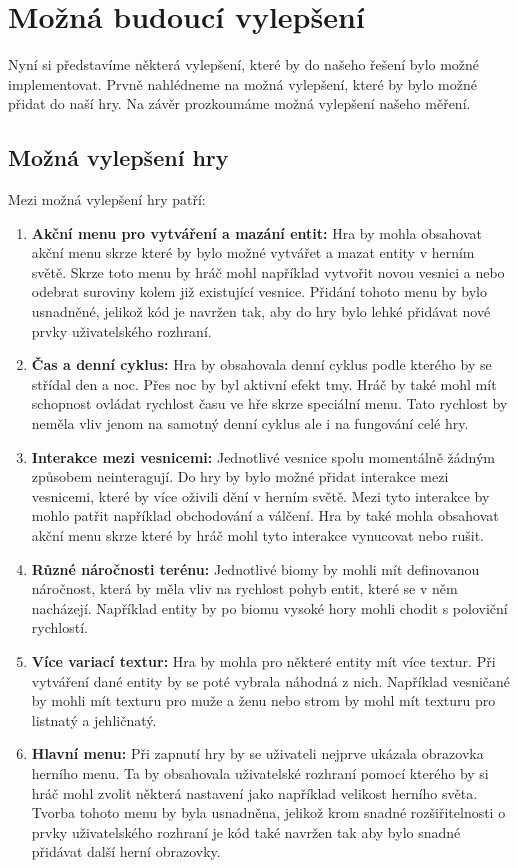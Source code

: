 \section{Možná budoucí vylepšení}
Nyní si představíme některá vylepšení, které by do našeho řešení bylo možné implementovat. Prvně nahlédneme na možná vylepšení, které by bylo možné přidat do naší hry. Na závěr prozkoumáme možná vylepšení našeho měření.

\subsection{Možná vylepšení hry}
Mezi možná vylepšení hry patří:

\begin{enumerate}
    \item \textbf{Akční menu pro vytváření a mazání entit:} Hra by mohla obsahovat akční menu skrze které by bylo možné vytvářet a mazat entity v herním světě. Skrze toto menu by hráč mohl například vytvořit novou vesnici a nebo odebrat suroviny kolem již existující vesnice. Přidání tohoto menu by bylo usnadněné, jelikož kód je navržen tak, aby do hry bylo lehké přidávat nové prvky uživatelského rozhraní. 

    \item \textbf{Čas a denní cyklus:} Hra by obsahovala denní cyklus podle kterého by se střídal den a noc. Přes noc by byl aktivní efekt tmy. Hráč by také mohl mít schopnost ovládat rychlost času ve hře skrze speciální menu. Tato rychlost by neměla vliv jenom na samotný denní cyklus ale i na fungování celé hry.

    \item \textbf{Interakce mezi vesnicemi:} Jednotlivé vesnice spolu momentálně žádným způsobem neinteragují. Do hry by bylo možné přidat interakce mezi vesnicemi, které by více oživili dění v herním světě. Mezi tyto interakce by mohlo patřit například obchodování a válčení. Hra by také mohla obsahovat akční menu skrze které by hráč mohl tyto interakce vynucovat nebo rušit.

    \item \textbf{Různé náročnosti terénu:} Jednotlivé biomy by mohli mít definovanou náročnost, která by měla vliv na rychlost pohyb entit, které se v něm nacházejí. Například entity by po biomu vysoké hory mohli chodit s poloviční rychlostí.

    \item \textbf{Více variací textur:} Hra by mohla pro některé entity mít více textur. Při vytváření dané entity by se poté vybrala náhodná z nich. Například vesničané by mohli mít texturu pro muže a ženu nebo strom by mohl mít texturu pro listnatý a jehličnatý.

    \item \textbf{Hlavní menu:} Při zapnutí hry by se uživateli nejprve ukázala obrazovka herního menu. Ta by obsahovala uživatelské rozhraní pomocí kterého by si hráč mohl zvolit některá nastavení jako například velikost herního světa. Tvorba tohoto menu by byla usnadněna, jelikož krom snadné rozšiřitelnosti o prvky uživatelského rozhraní je kód také navržen tak aby bylo snadné přidávat další herní obrazovky.
\end{enumerate}

